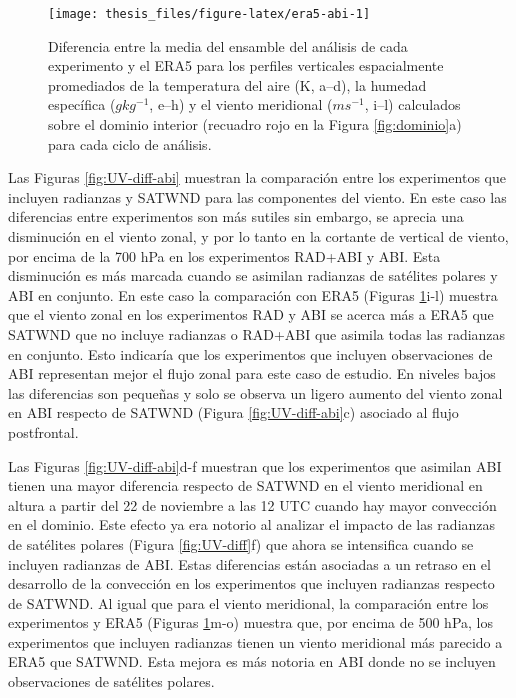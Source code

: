 \documentclass[12pt,oneside,a4paper]{reedthesis}
\begin{document}
\begin{figure}

\texttt{[image: thesis\_files/figure-latex/era5-abi-1]} \hfill{}

\caption{Diferencia entre la media del ensamble del análisis de cada experimento y el ERA5 para los perfiles verticales espacialmente promediados de la temperatura del aire (K, a--d), la humedad específica (\(g kg^{-1}\), e--h) y el viento meridional (\(m s^{-1}\), i--l) calculados sobre el dominio interior (recuadro rojo en la Figura \ref{fig:dominio}a) para cada ciclo de análisis.}\label{fig:era5-abi}
\end{figure}
Las Figuras \ref{fig:UV-diff-abi} muestran la comparación entre los experimentos que incluyen radianzas y SATWND para las componentes del viento. En este caso las diferencias entre experimentos son más sutiles sin embargo, se aprecia una disminución en el viento zonal, y por lo tanto en la cortante de vertical de viento, por encima de la 700 hPa en los experimentos RAD+ABI y ABI. Esta disminución es más marcada cuando se asimilan radianzas de satélites polares y ABI en conjunto. En este caso la comparación con ERA5 (Figuras \ref{fig:era5-abi}i-l) muestra que el viento zonal en los experimentos RAD y ABI se acerca más a ERA5 que SATWND que no incluye radianzas o RAD+ABI que asimila todas las radianzas en conjunto. Esto indicaría que los experimentos que incluyen observaciones de ABI representan mejor el flujo zonal para este caso de estudio. En niveles bajos las diferencias son pequeñas y solo se observa un ligero aumento del viento zonal en ABI respecto de SATWND (Figura \ref{fig:UV-diff-abi}c) asociado al flujo postfrontal.

Las Figuras \ref{fig:UV-diff-abi}d-f muestran que los experimentos que asimilan ABI tienen una mayor diferencia respecto de SATWND en el viento meridional en altura a partir del 22 de noviembre a las 12 UTC cuando hay mayor convección en el dominio. Este efecto ya era notorio al analizar el impacto de las radianzas de satélites polares (Figura \ref{fig:UV-diff}f) que ahora se intensifica cuando se incluyen radianzas de ABI. Estas diferencias están asociadas a un retraso en el desarrollo de la convección en los experimentos que incluyen radianzas respecto de SATWND. Al igual que para el viento meridional, la comparación entre los experimentos y ERA5 (Figuras \ref{fig:era5-abi}m-o) muestra que, por encima de 500 hPa, los experimentos que incluyen radianzas tienen un viento meridional más parecido a ERA5 que SATWND. Esta mejora es más notoria en ABI donde no se incluyen observaciones de satélites polares.
\end{document}
